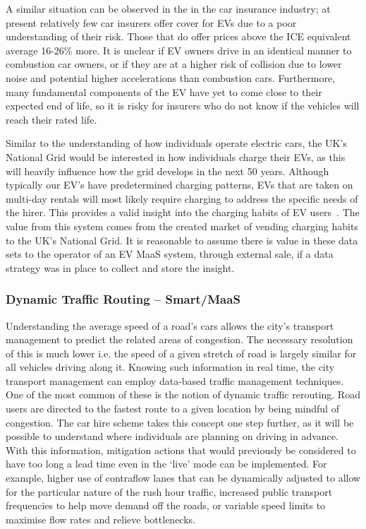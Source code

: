 \documentclass[journal]{IEEEtran}
\begin{document}
A similar situation can be observed in the in the car insurance
industry; at present relatively few car insurers offer cover for EVs
due to a poor understanding of their risk. Those that do offer prices
above the ICE equivalent average 16-26\% more. It is unclear if EV
owners drive in an identical manner to combustion car owners, or if
they are at a higher risk of collision due to lower noise and
potential higher accelerations than combustion cars. Furthermore, many
fundamental components of the EV have yet to come close to their
expected end of life, so it is risky for insurers who do not know if
the vehicles will reach their rated life.

Similar to the understanding of how individuals operate electric cars,
the UK’s National Grid would be interested in how individuals charge
their EVs, as this will heavily influence how the grid develops in the
next 50 years. Although typically our EV's have predetermined charging
patterns, EVs that are taken on multi-day rentals will most likely
require charging to address the specific needs of the hirer. This
provides a valid insight into the charging habits of EV
users~\cite{kennel-et-al:2012,darabi+ferdowsi:2013}. The value from
this system comes from the created market of vending charging habits
to the UK's National Grid. It is reasonable to assume there is value
in these data sets to the operator of an EV MaaS system, through
external sale, if a data strategy was in place to collect and store
the insight.

\subsubsection{Dynamic Traffic Routing -- Smart/MaaS} 

Understanding the average speed of a road's cars allows the city's
transport management to predict the related areas of congestion. The
necessary resolution of this is much lower i.e. the speed of a given
stretch of road is largely similar for all vehicles driving along
it. Knowing such information in real time, the city transport
management can employ data-based traffic management techniques. One of
the most common of these is the notion of dynamic traffic
rerouting. Road users are directed to the fastest route to a given
location by being mindful of congestion. The car hire scheme takes
this concept one step further, as it will be possible to understand
where individuals are planning on driving in advance. With this
information, mitigation actions that would previously be considered to
have too long a lead time even in the `live' mode can be
implemented. For example, higher use of contraflow lanes that can be
dynamically adjusted to allow for the particular nature of the rush
hour traffic, increased public transport frequencies to help move
demand off the roads, or variable speed limits to maximise flow rates
and relieve bottlenecks.
\end{document}
